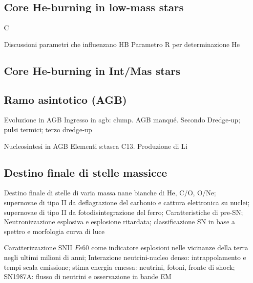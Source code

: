 \subsection{Core He-burning in low-mass stars}

\begin{frame}{C}
    
\end{frame}

\begin{frame}{Discussioni parametri che influenzano HB}
Parametro R per determinazione He
\end{frame}

\subsection{Core He-burning in Int/Mas stars}


\subsection{Ramo asintotico (AGB)}

\begin{frame}{Evoluzione in AGB}
Ingresso in agb: clump. AGB manqu\'e. Secondo Dredge-up; pulsi termici; terzo dredge-up
\end{frame}

\begin{frame}{Nucleosintesi in AGB}
Elementi s:tasca C13. Produzione di Li
\end{frame}

\subsection{Destino finale di stelle massicce}

\begin{frame}{Destino finale di stelle di varia massa}
nane bianche di He, C/O, O/Ne; supernovae di tipo II da deflagrazione del carbonio e cattura elettronica su nuclei; supernovae di tipo II da fotodisintegrazione del ferro; Caratteristiche di pre-SN; Neutronizzazione esplosiva e esplosione ritardata; classificazione SN in base a spettro e morfologia curva di luce
\end{frame}

\begin{frame}{Caratterizzazione SNII}
$Fe60$ come indicatore esplosioni nelle vicinanze della terra negli ultimi milioni di anni; Interazione neutrini-nucleo denso: intrappolamento e tempi scala emissione; stima energia emessa: neutrini, fotoni, fronte di shock; SN1987A: flusso di neutrini e osservazione in bande EM
\end{frame}


